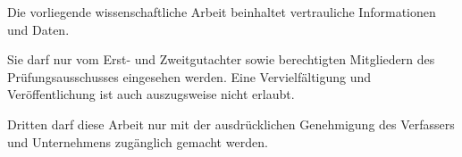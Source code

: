 
Die vorliegende wissenschaftliche Arbeit beinhaltet vertrauliche Informationen und Daten. 

Sie darf nur vom Erst- und Zweitgutachter sowie berechtigten Mitgliedern des Prüfungsausschusses eingesehen werden.
Eine Vervielfältigung und Veröffentlichung ist auch auszugsweise nicht erlaubt. 

Dritten darf diese Arbeit nur mit der ausdrücklichen Genehmigung des Verfassers und Unternehmens zugänglich gemacht werden.

